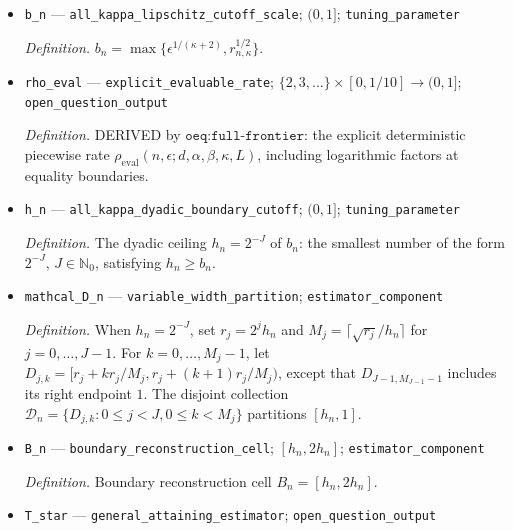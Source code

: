 \documentclass{article}
\begin{document}
\begin{itemize}
  \par\smallskip\noindent\emph{Definition.} \(r_{n,\kappa}=n^{-1/2}\) when \(0<\kappa<1\), \(r_{n,1}=\{\log(en)/n\}^{1/2}\), and \(r_{n,\kappa}=n^{-2/(\kappa+3)}\) when \(\kappa>1\).
  \item \texttt{b\_\allowbreak{}n} --- \texttt{all\_\allowbreak{}kappa\_\allowbreak{}lipschitz\_\allowbreak{}cutoff\_\allowbreak{}scale}; \((0,1]\); \texttt{tuning\_\allowbreak{}parameter}
  \par\smallskip\noindent\emph{Definition.} \(b_n=\max\{\epsilon^{1/(\kappa+2)},r_{n,\kappa}^{1/2}\}\).
  \item \texttt{rho\_\allowbreak{}eval} --- \texttt{explicit\_\allowbreak{}evaluable\_\allowbreak{}rate}; \(\{2,3,\ldots\}\times[0,1/10]\to(0,1]\); \texttt{open\_\allowbreak{}question\_\allowbreak{}output}
  \par\smallskip\noindent\emph{Definition.} DERIVED by \(\texttt{oeq:full-frontier}\): the explicit deterministic piecewise rate \(\rho_{\mathrm{eval}}(n,\epsilon;d,\alpha,\beta,\kappa,L)\), including logarithmic factors at equality boundaries.
  \item \texttt{h\_\allowbreak{}n} --- \texttt{all\_\allowbreak{}kappa\_\allowbreak{}dyadic\_\allowbreak{}boundary\_\allowbreak{}cutoff}; \((0,1]\); \texttt{tuning\_\allowbreak{}parameter}
  \par\smallskip\noindent\emph{Definition.} The dyadic ceiling \(h_n=2^{-J}\) of \(b_n\): the smallest number of the form \(2^{-J}\), \(J\in\mathbb N_0\), satisfying \(h_n\geq b_n\).
  \item \texttt{mathcal\_\allowbreak{}D\_\allowbreak{}n} --- \texttt{variable\_\allowbreak{}width\_\allowbreak{}partition}; \texttt{estimator\_\allowbreak{}component}
  \par\smallskip\noindent\emph{Definition.} When \(h_n=2^{-J}\), set \(r_j=2^jh_n\) and \(M_j=\lceil\sqrt{r_j}/h_n\rceil\) for \(j=0,\ldots,J-1\). For \(k=0,\ldots,M_j-1\), let \(D_{j,k}=[r_j+kr_j/M_j,r_j+(k+1)r_j/M_j)\), except that \(D_{J-1,M_{J-1}-1}\) includes its right endpoint \(1\). The disjoint collection \(\mathcal D_n=\{D_{j,k}:0\leq j<J,0\leq k<M_j\}\) partitions \([h_n,1]\).
  \item \texttt{B\_\allowbreak{}n} --- \texttt{boundary\_\allowbreak{}reconstruction\_\allowbreak{}cell}; \([h_n,2h_n]\); \texttt{estimator\_\allowbreak{}component}
  \par\smallskip\noindent\emph{Definition.} Boundary reconstruction cell \(B_n=[h_n,2h_n]\).
  \item \texttt{T\_\allowbreak{}star} --- \texttt{general\_\allowbreak{}attaining\_\allowbreak{}estimator}; \texttt{open\_\allowbreak{}question\_\allowbreak{}output}

\end{itemize}
\end{document}
